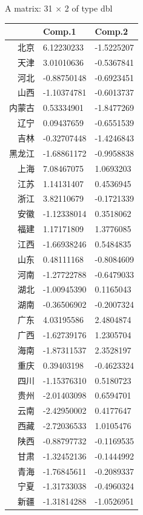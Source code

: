 \documentclass[UTF8,a4paper]{ctexart}
\begin{document}
    A matrix: 31 × 2 of type dbl
\begin{tabular}{r|ll}
  & Comp.1 & Comp.2\\
\hline
	北京 &  6.12230233 & -1.5225207\\
	天津 &  3.01010636 & -0.5367841\\
	河北 & -0.88750148 & -0.6923451\\
	山西 & -1.10374781 & -0.6013737\\
	内蒙古 &  0.53334901 & -1.8477269\\
	辽宁 &  0.09437659 & -0.6551539\\
	吉林 & -0.32707448 & -1.4246843\\
	黑龙江 & -1.68861172 & -0.9958838\\
	上海 &  7.08467075 &  1.0693203\\
	江苏 &  1.14131407 &  0.4536945\\
	浙江 &  3.82110679 & -0.1721339\\
	安徽 & -1.12338014 &  0.3518062\\
	福建 &  1.17171809 &  1.3776085\\
	江西 & -1.66938246 &  0.5484835\\
	山东 &  0.48111168 & -0.8084609\\
	河南 & -1.27722788 & -0.6479033\\
	湖北 & -1.00945390 &  0.1165043\\
	湖南 & -0.36506902 & -0.2007324\\
	广东 &  4.03195586 &  2.4804874\\
	广西 & -1.62739176 &  1.2305704\\
	海南 & -1.87311537 &  2.3528197\\
	重庆 &  0.39403198 & -0.4623324\\
	四川 & -1.15376310 &  0.5180723\\
	贵州 & -2.01403098 &  0.6594701\\
	云南 & -2.42950002 &  0.4177647\\
	西藏 & -2.72036533 &  1.0105476\\
	陕西 & -0.88797732 & -0.1169535\\
	甘肃 & -1.32452136 & -0.1444992\\
	青海 & -1.76845611 & -0.2089337\\
	宁夏 & -1.31733038 & -0.4960324\\
	新疆 & -1.31814288 & -1.0526951\\
\end{tabular}
\end{document}
